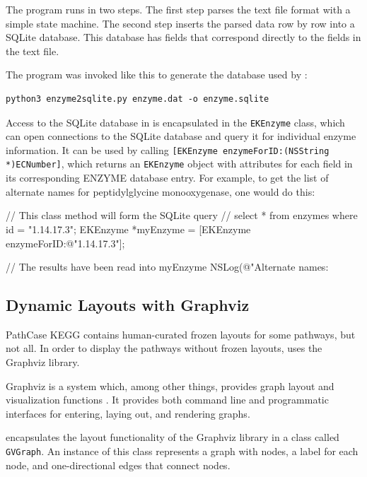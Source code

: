 The program runs in two steps. The first step parses the text file format with a
simple state machine. The second step inserts the parsed data row by row
into a SQLite database. This database has fields that correspond directly to the
fields in the text file.

The program was invoked like this to generate the database used by \keggapp:

\begin{verbatim}
python3 enzyme2sqlite.py enzyme.dat -o enzyme.sqlite
\end{verbatim}

Access to the SQLite database in \keggapp is encapsulated in the
\texttt{EKEnzyme} class, which can open connections to the SQLite database and
query it for individual enzyme information. It can be used by calling
\texttt{[EKEnzyme enzymeForID:(NSString *)ECNumber]}, which returns an
\texttt{EKEnzyme} object with attributes for each field in its corresponding
ENZYME database entry. For example, to get the list of alternate names for
peptidylglycine monooxygenase, one would do this:

\begin{objc}
    // This class method will form the SQLite query
    // select * from enzymes where id = "1.14.17.3";
    EKEnzyme *myEnzyme = [EKEnzyme enzymeForID:@"1.14.17.3"];

    // The results have been read into myEnzyme
    NSLog(@"Alternate names: %
\end{objc}

\subsection{Dynamic Layouts with Graphviz}
\label{sect:kegg_impl_graphviz}

PathCase KEGG contains human-curated frozen layouts for some pathways, but not
all. In order to display the pathways without frozen layouts, \keggapp
uses the Graphviz library.

Graphviz is a system which, among other things, provides graph layout and
visualization functions \cite{graphviz}. It provides both command line and
programmatic interfaces for entering, laying out, and rendering graphs.

\keggapp encapsulates the layout functionality of the Graphviz library in a
class called \texttt{GVGraph}. An instance of this class represents a graph with
nodes, a label for each node, and one-directional edges that connect nodes.

